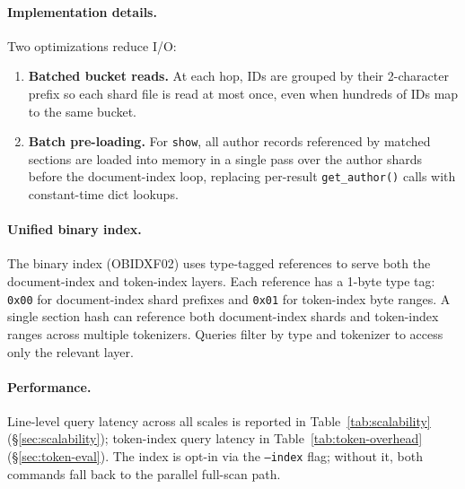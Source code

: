 \paragraph{Implementation details.}
Two optimizations reduce I/O:
\begin{enumerate}
	\item \textbf{Batched bucket reads.} At each hop, IDs are grouped by their 2-character prefix so each shard file is read at most once, even when hundreds of IDs map to the same bucket.
	\item \textbf{Batch pre-loading.} For \texttt{show}, all author records referenced by matched sections are loaded into memory in a single pass over the author shards before the document-index loop, replacing per-result \texttt{get\_author()} calls with constant-time dict lookups.
\end{enumerate}

\paragraph{Unified binary index.}
The binary index (OBIDXF02) uses type-tagged references to serve both the document-index and token-index layers. Each reference has a 1-byte type tag: \texttt{0x00} for document-index shard prefixes and \texttt{0x01} for token-index byte ranges. A single section hash can reference both document-index shards and token-index ranges across multiple tokenizers. Queries filter by type and tokenizer to access only the relevant layer.

\paragraph{Performance.}
Line-level query latency across all scales is reported in Table~\ref{tab:scalability} (\S\ref{sec:scalability}); token-index query latency in Table~\ref{tab:token-overhead} (\S\ref{sec:token-eval}). The index is opt-in via the \texttt{--index} flag; without it, both commands fall back to the parallel full-scan path.
